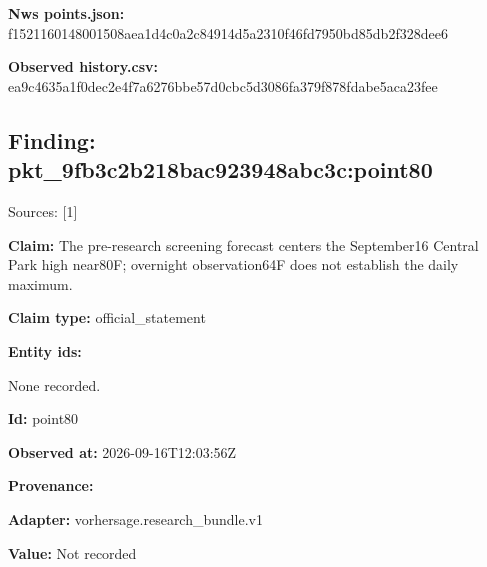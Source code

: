 \documentclass[11pt]{article}
\begin{document}
\par\noindent\textbf{Nws points.json:} f15211601480\hspace{0pt}01508aea1d4c\hspace{0pt}0a2c84914d5a\hspace{0pt}2310f46fd795\hspace{0pt}0bd85db2f328\hspace{0pt}dee6

\par\noindent\textbf{Observed history.csv:} ea9c4635a1f0\hspace{0pt}dec2e4f7a627\hspace{0pt}6bbe57d0cbc5\hspace{0pt}d3086fa379f8\hspace{0pt}78fdabe5aca2\hspace{0pt}3fee

\subsection*{\textcolor{epdarkgreen}{Finding: pkt\_9fb3c2b2\hspace{0pt}18bac923948a\hspace{0pt}bc3c:point80}}
Sources: [1]


\par\noindent\textbf{Claim:} The pre-research screening forecast centers the September16 Central Park high near80F; overnight observation64F does not establish the daily maximum.

\par\noindent\textbf{Claim type:} official\_statement

\par\noindent\textbf{Entity ids:} \par None recorded.

\par\noindent\textbf{Id:} point80

\par\noindent\textbf{Observed at:} 2026-09-16T12:03:56Z

\par\noindent\textbf{Provenance:} \par \par\noindent\textbf{Adapter:} vorhersage.r\hspace{0pt}esearch\_bund\hspace{0pt}le.v1

\par\noindent\textbf{Value:} Not recorded
\end{document}
